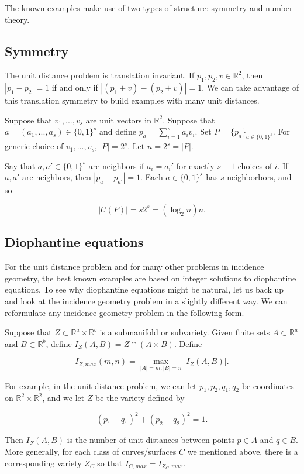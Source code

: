 \documentclass{amsart}
\newcommand{\RR}{\mathbb{R}}
\begin{document}
The known examples make use of two types of structure: symmetry and number theory.

\subsection{Symmetry}

The unit distance problem is translation invariant.  If $p_1, p_2,  v \in \RR^2$,  then $|p_1 - p_2| = 1$ if and only if $| (p_1 + v) - (p_2 + v)| = 1$.   We can take advantage of this translation symmetry to build examples with many unit distances.

Suppose that $v_1, ..., v_s$ are unit vectors in $\RR^2$.   Suppose that $a = (a_1, ..., a_s) \in \{0, 1\}^s$ and define $p_a = \sum_{i=1}^s a_i v_i$.   Set $P = \{ p_a \}_{a \in \{0, 1 \}^s}$.   For generic choice of $v_1, ..., v_s$,  $|P| = 2^s$.   Let $n = 2^s = |P|$.

Say that $a,  a' \in \{0, 1 \}^s$ are neighbors if $a_i = a_i'$ for exactly $s-1$ choices of $i$.   If $a,a'$ are neighbors,  then $|p_a - p_{a'}| = 1$.   Each $a \in \{ 0,  1 \}^s$ has $s$ neighborbors,  and so

$$ |U(P)| = s 2^s = (\log_2 n) n. $$

\subsection{Diophantine equations} \label{subsecdioph}

For the unit distance problem and for many other problems in incidence geometry,  the best known examples are based on integer solutions to diophantine equations.   To see why diophantine equations might be natural,  let us back up and look at the incidence geometry problem in a slightly different way.   We can reformulate any incidence geometry problem in the following form.

Suppose that $Z \subset \RR^a \times \RR^b$ is a submanifold or subvariety.   Given finite sets $A \subset \RR^a$ and $B \subset \RR^b$,  define $I_Z(A,B) = Z \cap (A \times B)$.    Define

$$ I_{Z, max}(m,n) = \max_{|A| = m, |B| = n } |I_Z(A,B)|. $$

For example,  in the unit distance problem,  we can let $p_1, p_2, q_1,q_2$ be coordinates on $\RR^2 \times \RR^2$,  and we let $Z$ be the variety defined by

$$ (p_1 - q_1)^2 + (p_2 - q_2)^2 = 1. $$

\noindent Then $I_Z(A,B)$ is the number of unit distances between points $p \in A$ and $q \in B$.   More generally,  for each class of curves/surfaces $C$ we mentioned above,  there is a corresponding variety $Z_C$ so that $I_{C, max} = I_{Z_C, max}$.   
\end{document}
